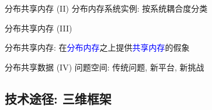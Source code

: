 \begin{frame}{分布共享内存 (II)}
  分布内存系统实例: 按系统耦合度分类
\end{frame}
\begin{frame}{分布共享内存 (III)}
  \begin{center}
    分布共享内存: 在\textcolor{blue}{分布内存}之上提供\textcolor{blue}{共享内存}的假象
  \end{center}

\end{frame}
\begin{frame}{分布共享数据 (IV)}
  问题空间: 传统问题, 新平台, 新挑战
\end{frame}
\subsection{技术途径: 三维框架}

